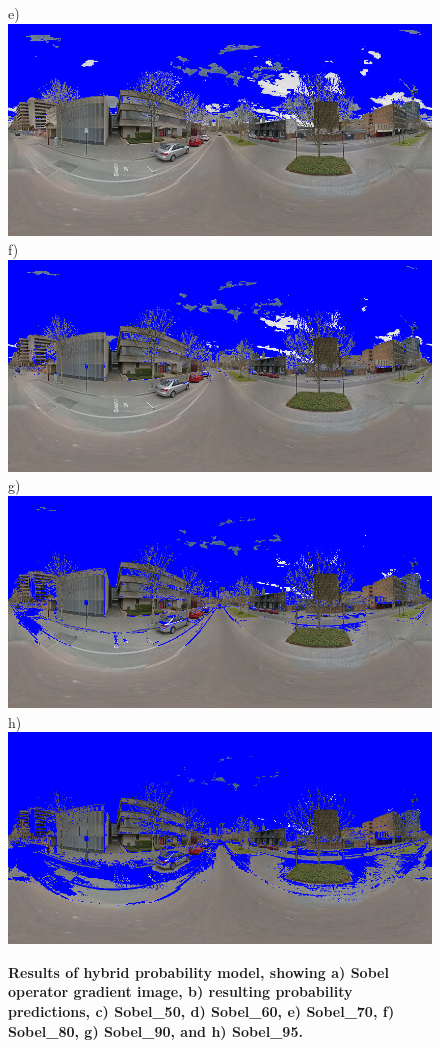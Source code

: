 \documentclass[final,3p,times,authoryear]{elsarticle}
\begin{document}
\begin{figure}
e)\includegraphics[scale=0.20]{Images/panorama-ESuX4xmQ_fDc50NK6CnfZQ-1_Sobel_80_marked.png} 
f)\includegraphics[scale=0.20]{Images/panorama-ESuX4xmQ_fDc50NK6CnfZQ-1_Sobel_70_marked.png} 
g)\includegraphics[scale=0.20]{Images/panorama-ESuX4xmQ_fDc50NK6CnfZQ-1_Sobel_60_marked.png} 
h)\includegraphics[scale=0.20]{Images/panorama-ESuX4xmQ_fDc50NK6CnfZQ-1_Sobel_50_marked.png} 
\caption{\bf  Results of hybrid probability model, showing a) Sobel operator gradient image, b) resulting probability predictions, c) Sobel\_50, d) Sobel\_60, e) Sobel\_70, f) Sobel\_80, g) Sobel\_90, and h) Sobel\_95.}    
 \label{fig:sobolresults}  
\end{figure} 
\end{document}

